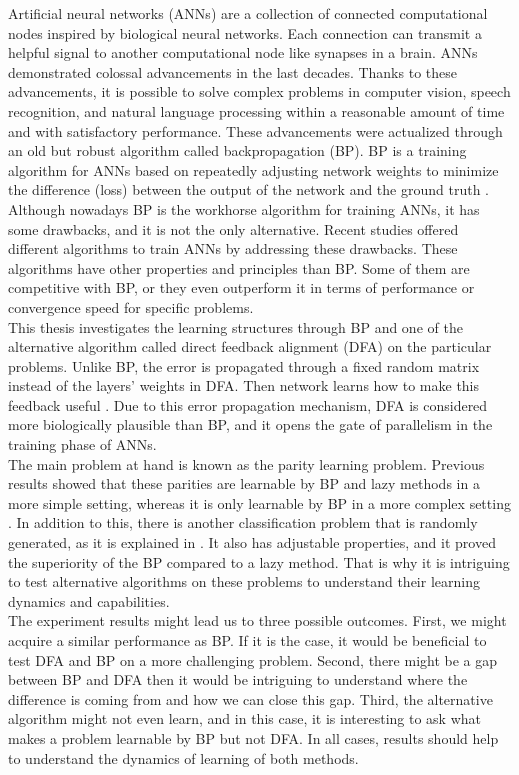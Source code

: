 \documentclass[a4paper, nobind]{templates/ociamthesis}
\begin{document}
Artificial neural networks (ANNs) are a collection of connected computational nodes inspired by biological neural networks. Each connection can transmit a helpful signal to another computational node like synapses in a brain. ANNs demonstrated colossal advancements in the last decades. Thanks to these advancements, it is possible to solve complex problems in computer vision, speech recognition, and natural language processing within a reasonable amount of time and with satisfactory performance. These advancements were actualized through an old but robust algorithm called backpropagation (BP). BP is a training algorithm for ANNs based on repeatedly adjusting network weights to minimize the difference (loss) between the output of the network and the ground truth \cite{Rumelhart:1986we}.\\
Although nowadays BP is the workhorse algorithm for training ANNs, it has some drawbacks, and it is not the only alternative. Recent studies offered different algorithms to train ANNs by addressing these drawbacks. These algorithms have other properties and principles than BP. Some of them are competitive with BP, or they even outperform it in terms of performance or convergence speed for specific problems.\\
This thesis investigates the learning structures through BP and one of the alternative algorithm called direct feedback alignment (DFA) on the particular problems. Unlike BP, the error is propagated through a fixed random matrix instead of the layers' weights in DFA. Then network learns how to make this feedback useful \cite{nøkland2016direct}. Due to this error propagation mechanism, DFA is considered more biologically plausible than BP, and it opens the gate of parallelism in the training phase of ANNs.\\
The main problem at hand is known as the parity learning problem. Previous results showed that these parities are learnable by BP and lazy methods in a more simple setting, whereas it is only learnable by BP in a more complex setting \cite{DBLP:journals/corr/abs-2002-07400}. In addition to this, there is another classification problem that is randomly generated, as it is explained in \cite{chizat2020implicit}. It also has adjustable properties, and it proved the superiority of the BP compared to a lazy method. That is why it is intriguing to test alternative algorithms on these problems to understand their learning dynamics and capabilities.\\
The experiment results might lead us to three possible outcomes. First, we might acquire a similar performance as BP. If it is the case, it would be beneficial to test DFA and BP on a more challenging problem. Second, there might be a gap between BP and DFA then it would be intriguing to understand where the difference is coming from and how we can close this gap. Third, the alternative algorithm might not even learn, and in this case, it is interesting to ask what makes a problem learnable by BP but not DFA. In all cases, results should help to understand the dynamics of learning of both methods.\\
\end{document}
